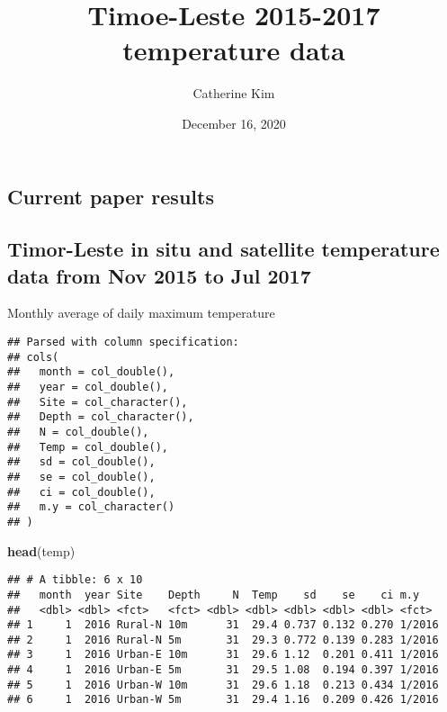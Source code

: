 \documentclass[
]{article}
\title{Timoe-Leste 2015-2017 temperature data}
\author{Catherine Kim}
\date{December 16, 2020}
\newenvironment{Shaded}{\begin{snugshade}}{\end{snugshade}}
\newcommand{\KeywordTok}[1]{\textcolor[rgb]{0.13,0.29,0.53}{\textbf{#1}}}
\newcommand{\NormalTok}[1]{#1}
\newcommand{\OperatorTok}[1]{\textcolor[rgb]{0.81,0.36,0.00}{\textbf{#1}}}
\newcommand{\StringTok}[1]{\textcolor[rgb]{0.31,0.60,0.02}{#1}}
\begin{document}
\maketitle

\hypertarget{current-paper-results}{%
\subsection{Current paper results}\label{current-paper-results}}

\hypertarget{timor-leste-in-situ-and-satellite-temperature-data-from-nov-2015-to-jul-2017}{%
\subsection{Timor-Leste in situ and satellite temperature data from Nov
2015 to Jul
2017}\label{timor-leste-in-situ-and-satellite-temperature-data-from-nov-2015-to-jul-2017}}

Monthly average of daily maximum temperature

\begin{Shaded}
\end{Shaded}

\begin{verbatim}
## Parsed with column specification:
## cols(
##   month = col_double(),
##   year = col_double(),
##   Site = col_character(),
##   Depth = col_character(),
##   N = col_double(),
##   Temp = col_double(),
##   sd = col_double(),
##   se = col_double(),
##   ci = col_double(),
##   m.y = col_character()
## )
\end{verbatim}

\begin{Shaded}
\begin{Highlighting}[]
\KeywordTok{head}\NormalTok{(temp)}
\end{Highlighting}
\end{Shaded}

\begin{verbatim}
## # A tibble: 6 x 10
##   month  year Site    Depth     N  Temp    sd    se    ci m.y   
##   <dbl> <dbl> <fct>   <fct> <dbl> <dbl> <dbl> <dbl> <dbl> <fct> 
## 1     1  2016 Rural-N 10m      31  29.4 0.737 0.132 0.270 1/2016
## 2     1  2016 Rural-N 5m       31  29.3 0.772 0.139 0.283 1/2016
## 3     1  2016 Urban-E 10m      31  29.6 1.12  0.201 0.411 1/2016
## 4     1  2016 Urban-E 5m       31  29.5 1.08  0.194 0.397 1/2016
## 5     1  2016 Urban-W 10m      31  29.6 1.18  0.213 0.434 1/2016
## 6     1  2016 Urban-W 5m       31  29.4 1.16  0.209 0.426 1/2016
\end{verbatim}
\end{document}
